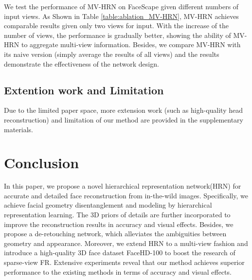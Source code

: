 \documentclass[10pt,twocolumn,letterpaper]{article}
\begin{document}
 We test the performance of MV-HRN on FaceScape given different numbers of input views. As Shown in Table \ref{table:ablation_MV-HRN}, MV-HRN achieves comparable results given only two views for input. With the increase of the number of views, the performance is gradually better, showing the ability of MV-HRN to aggregate multi-view information. Besides, we compare MV-HRN with its naive version (simply average the results of all views) and the results demonstrate the effectiveness of the network design.

\subsection{Extention work and Limitation}
Due to the limited paper space, more extension work (such as high-quality head reconstruction) and limitation of our method are provided in the supplementary materials.

\section{Conclusion}
In this paper, we propose a novel hierarchical representation network(HRN) for accurate and detailed face reconstruction from in-the-wild images. Specifically, we achieve facial geometry disentanglement and modeling by hierarchical representation learning. The 3D priors of details are further incorporated to improve the reconstruction results in accuracy and visual effects.
Besides, we propose a de-retouching network, which alleviates the ambiguities between geometry and appearance. Moreover, we extend HRN to a multi-view fashion and introduce a high-quality 3D face dataset FaceHD-100 to boost the research of sparse-view FR. Extensive experiments reveal that our method achieves superior performance to the existing methods in terms of accuracy and visual effects.

\clearpage

{\small


}
\end{document}
